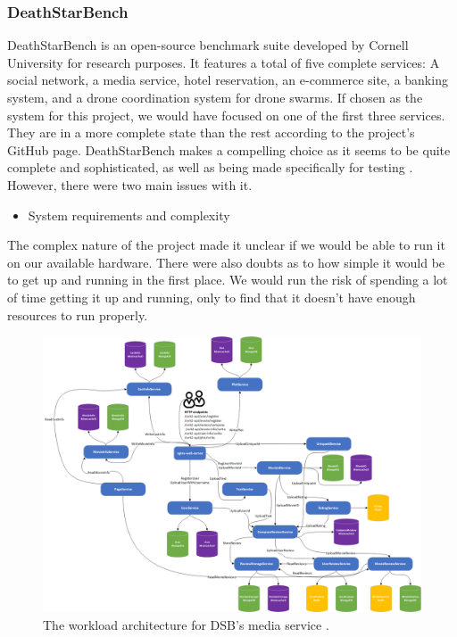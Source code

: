 \subsubsection{DeathStarBench}
DeathStarBench is an open-source benchmark suite developed by Cornell University for research purposes. 
It features a total of five complete services: A social network, a media service, hotel reservation, an e-commerce site, a banking system, and a drone coordination system for drone swarms. If chosen as the system for this project, we would have focused on one of the first three services. They are in a more complete state than the rest according to the project's GitHub page. 
DeathStarBench makes a compelling choice as it seems to be quite complete and sophisticated, as well as being made specifically for testing \cite*{Gan2019}. \\
However, there were two main issues with it.
\begin{itemize}
    \item System requirements and complexity
\end{itemize}
The complex nature of the project made it unclear if we would be able to run it on our available hardware. There were also doubts as to how simple it would be to get up and running in the first place. We would run the risk of spending a lot of time getting it up and running, only to find that it doesn't have enough resources to run properly.
\begin{figure}[ht]
\centering 
\includegraphics[width=\columnwidth]{Figures/Charts/media_microservices_architecture.png}
\caption{The workload architecture for DSB's media service \cite*{Gan2019}.}
\label{DSB-media}
\end{figure}
